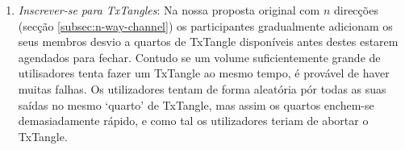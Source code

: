 \begin{enumerate}
    \item {\em Inscrever-se para TxTangles}: Na nossa proposta original com $n$ direcções (secção \ref{subsec:n-way-channel}) os participantes gradualmente adicionam os seus membros desvio a quartos de TxTangle disponíveis antes destes estarem agendados para fechar. Contudo se um volume suficientemente grande de utilisadores tenta fazer um TxTangle ao mesmo tempo, é provável de haver muitas falhas. Os utilizadores tentam de forma aleatória pór todas as suas saídas no mesmo `quarto' de TxTangle, mas assim os quartos enchem-se demasiadamente rápido, e como tal os utilizadores teriam de abortar o TxTangle.        


\end{enumerate}
